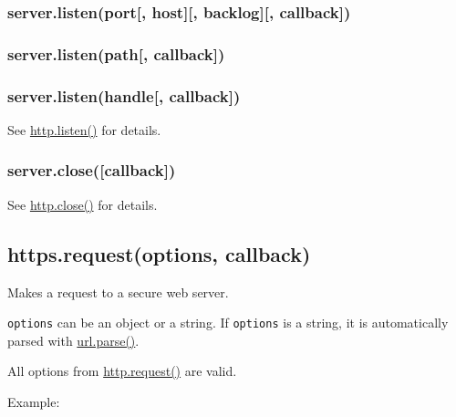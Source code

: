 \subsubsection{server.listen(port{[}, host{]}{[}, backlog{]}{[},
callback{]})}\label{server.listenport-host-backlog-callback}

\subsubsection{server.listen(path{[},
callback{]})}\label{server.listenpath-callback}

\subsubsection{server.listen(handle{[},
callback{]})}\label{server.listenhandle-callback}

See
\href{http.html\#http_server_listen_port_hostname_backlog_callback}{http.listen()}
for details.

\subsubsection{server.close({[}callback{]})}\label{server.closecallback}

See \href{http.html\#http_server_close_callback}{http.close()} for
details.

\subsection{https.request(options,
callback)}\label{https.requestoptions-callback}

Makes a request to a secure web server.

\texttt{options} can be an object or a string. If \texttt{options} is a
string, it is automatically parsed with
\href{url.html\#url.parse}{url.parse()}.

All options from
\href{http.html\#http_http_request_options_callback}{http.request()} are
valid.

Example:

